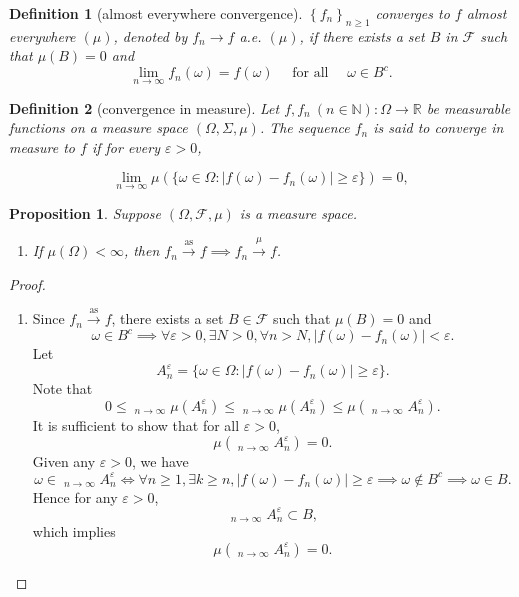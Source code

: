 \documentclass{report}
\newtheorem{definition}{Definition}[section]
\newtheorem{proposition}{Proposition}[section]
\theoremstyle{nonumberplain}
\newtheorem{proof}{Proof.}
\DeclareMathOperator*\lowlim{\underline{lim}}
\DeclareMathOperator*\uplim{\overline{lim}}
\begin{document}
\begin{definition}[almost everywhere convergence]
	$\left\{f_{n}\right\}_{n \geq 1}$ converges to $f$ almost everywhere $(\mu)$, denoted by $f_{n} \rightarrow f$ a.e. $(\mu)$, if there exists a set $B$ in $\mathcal{F}$ such that $\mu(B)=0$ and
	$$
	\lim _{n \rightarrow \infty} f_{n}(\omega)=f(\omega) \quad \text { for all } \quad \omega \in B^{c} .
	$$
\end{definition}

\begin{definition}[convergence in measure]
	Let $f,f_{n}\ (n\in {\mathbb  N}):\Omega\to {\mathbb  R}$ be measurable functions on a measure space $(\Omega,\Sigma ,\mu )$. The sequence $ f_{n}$ is said to converge in measure to $f$ if for every $\varepsilon >0$,
	
	$$\lim_{{n\to \infty }}\mu \left(\{\omega\in \Omega:|f(\omega)-f_{n}(\omega)|\geq \varepsilon \}\right)=0,$$
\end{definition}

\begin{proposition}
	Suppose $(\Omega,\mathcal{F},\mu)$ is a measure space.
	\begin{enumerate}
		\item If $\mu(\Omega)<\infty$, then $f_n\xrightarrow{\text{as}}f\implies f_n\xrightarrow{\mu}f$.
	\end{enumerate}
\end{proposition}
\begin{proof}
	\begin{enumerate}
		\item 
		Since $f_n\xrightarrow{\text{as}}f$, there exists a set $B\in\mathcal{F}$ such that $\mu(B)=0$ and
		\[
			\omega\in B^c\implies\forall\varepsilon>0,\exists N>0,\forall n>N,|f(\omega)-f_n(\omega)|<\varepsilon.
		\]
		Let 
		\[
			A_n^\varepsilon = \{\omega\in \Omega:|f(\omega)-f_{n}(\omega)|\geq \varepsilon \}.
		\]
		Note that
		\[
			0\le\lowlim_{n\to\infty}\mu\left(A_{n}^\varepsilon\right)\le\uplim_{n\to\infty} \mu\left(A_{n}^\varepsilon\right)\le\mu\left(\uplim_{n\to\infty} A_{n}^\varepsilon\right).
		\]
		It is sufficient to show that for all $\varepsilon>0$,
		\[
			\mu\left(\uplim_{n\to\infty} A_{n}^\varepsilon\right)=0.
		\]
		Given any $\varepsilon>0$, we have
		\[
			\omega\in\uplim_{n\to\infty} A_{n}^\varepsilon\iff\forall n\ge1,\exists k\ge n,|f(\omega)-f_{n}(\omega)|\geq \varepsilon\implies\omega\notin B^c\implies \omega \in B.
		\]
		Hence for any $\varepsilon>0$,
		\[
			\uplim_{n\to\infty} A_{n}^\varepsilon\subset B,
		\]
		which implies 
		\[
			\mu\left(\uplim_{n\to\infty} A_{n}^\varepsilon\right)=0.
		\]
	\end{enumerate}
\end{proof}
\end{document}
